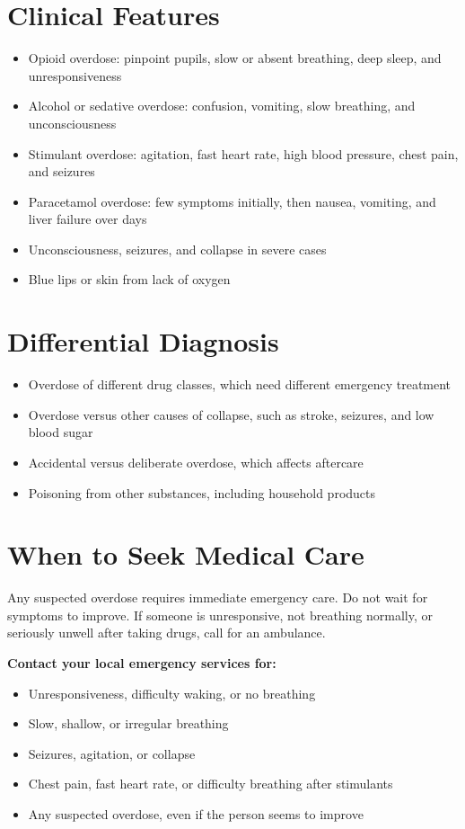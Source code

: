 \section*{Clinical Features}
\begin{itemize}
    \item Opioid overdose: pinpoint pupils, slow or absent breathing, deep sleep, and unresponsiveness
    \item Alcohol or sedative overdose: confusion, vomiting, slow breathing, and unconsciousness
    \item Stimulant overdose: agitation, fast heart rate, high blood pressure, chest pain, and seizures
    \item Paracetamol overdose: few symptoms initially, then nausea, vomiting, and liver failure over days
    \item Unconsciousness, seizures, and collapse in severe cases
    \item Blue lips or skin from lack of oxygen
\end{itemize}

\section*{Differential Diagnosis}
\begin{itemize}
    \item Overdose of different drug classes, which need different emergency treatment
    \item Overdose versus other causes of collapse, such as stroke, seizures, and low blood sugar
    \item Accidental versus deliberate overdose, which affects aftercare
    \item Poisoning from other substances, including household products
\end{itemize}

\section*{When to Seek Medical Care}
Any suspected overdose requires immediate emergency care. Do not wait for symptoms to improve. If someone is unresponsive, not breathing normally, or seriously unwell after taking drugs, call for an ambulance.

\textbf{Contact your local emergency services for:}
\begin{itemize}
    \item Unresponsiveness, difficulty waking, or no breathing
    \item Slow, shallow, or irregular breathing
    \item Seizures, agitation, or collapse
    \item Chest pain, fast heart rate, or difficulty breathing after stimulants
    \item Any suspected overdose, even if the person seems to improve
\end{itemize}

